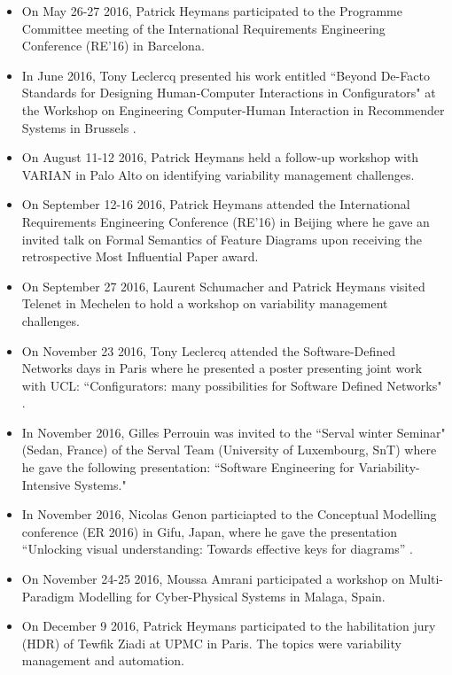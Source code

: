 \begin{itemize}
\item On May 26-27 2016, Patrick Heymans participated to the Programme Committee meeting of the International Requirements Engineering Conference (RE'16) in Barcelona.

\item In June 2016, Tony Leclercq presented his work entitled ``Beyond De-Facto Standards for Designing Human-Computer Interactions in Configurators" at the Workshop on Engineering Computer-Human Interaction in Recommender Systems in Brussels \cite{Lecelercq16a}.  

\item On August 11-12 2016, Patrick Heymans held a follow-up workshop with VARIAN in Palo Alto on identifying variability management challenges.

\item On September 12-16 2016, Patrick Heymans attended the International Requirements Engineering Conference (RE'16) in Beijing where he gave an invited talk on Formal Semantics of Feature Diagrams upon receiving the retrospective Most Influential Paper award. 

\item On September 27 2016, Laurent Schumacher and Patrick Heymans visited Telenet in Mechelen to hold a workshop on variability management challenges.

\item On November 23 2016, Tony Leclercq attended the Software-Defined Networks days in Paris where he presented a poster presenting  joint work with UCL: ``Configurators: many possibilities for Software Defined Networks" \cite{Leclercq16}.

\item In November 2016, Gilles Perrouin was invited to the ``Serval winter Seminar" (Sedan, France) of the Serval Team (University of Luxembourg, SnT)  where he gave the following presentation: ``Software Engineering for Variability-Intensive Systems."

\item In November 2016, Nicolas Genon particiapted to the Conceptual Modelling conference (ER 2016) in Gifu, Japan, where he gave the presentation ``Unlocking visual understanding: Towards effective keys for diagrams'' \cite{Genon16}.

\item On November 24-25 2016, Moussa Amrani participated a workshop on Multi-Paradigm Modelling for Cyber-Physical Systems in Malaga, Spain.

\item On December 9 2016, Patrick Heymans participated to the habilitation jury (HDR) of Tewfik Ziadi at UPMC in Paris. The topics were variability management and automation. 


\end{itemize}

